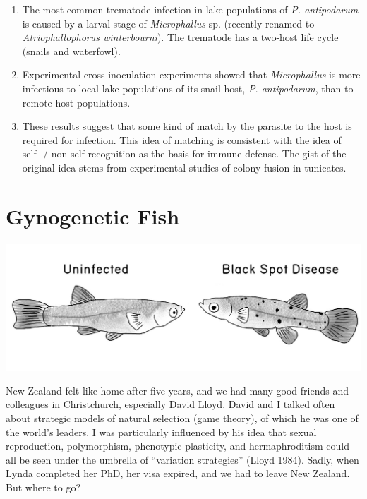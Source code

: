 \documentclass[
  letterpaper,
]{book}
\begin{document}
\begin{enumerate}
\def\labelenumi{\arabic{enumi}.}
\item
  The most common trematode infection in lake populations of \emph{P.
  antipodarum} is caused by a larval stage of \emph{Microphallus} sp.
  (recently renamed to \emph{Atriophallophorus winterbourni}). The
  trematode has a two-host life cycle (snails and waterfowl).
\item
  Experimental cross-inoculation experiments showed that
  \emph{Microphallus} is more infectious to local lake populations of
  its snail host, \emph{P. antipodarum}, than to remote host
  populations.
\item
  These results suggest that some kind of match by the parasite to the
  host is required for infection. This idea of matching is consistent
  with the idea of self- / non-self-recognition as the basis for immune
  defense. The gist of the original idea stems from experimental studies
  of colony fusion in tunicates.
\end{enumerate}


\chapter{Gynogenetic Fish}\label{gynogenetic-fish}

\begin{center}
\includegraphics{images/fig5-1.jpeg}
\end{center}

New Zealand felt like home after five years, and we had many good
friends and colleagues in Christchurch, especially David Lloyd. David
and I talked often about strategic models of natural selection (game
theory), of which he was one of the world's leaders. I was particularly
influenced by his idea that sexual reproduction, polymorphism,
phenotypic plasticity, and hermaphroditism could all be seen under the
umbrella of ``variation strategies'' (Lloyd 1984). Sadly, when Lynda
completed her PhD, her visa expired, and we had to leave New Zealand.
But where to go?
\end{document}
